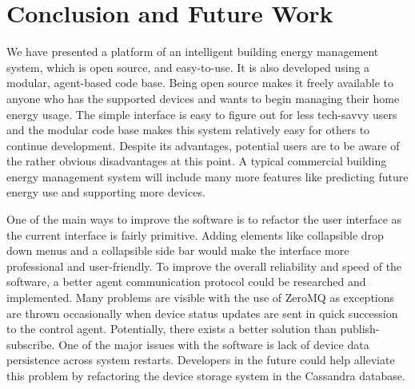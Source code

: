 \documentclass[conference]{IEEEtran}
\begin{document}
\section{Conclusion and Future Work}
\label{sec:conclusion}

We have presented a platform of an intelligent building energy management system,
which is open source, and easy-to-use. It is also developed using a modular, agent-based code base. Being open source makes it freely available to anyone who has the supported devices and wants to begin managing their home energy usage. The simple interface is easy to figure out for less tech-savvy users and the modular code base makes this system relatively easy for others to continue development. Despite its advantages, potential users are to be aware of the rather obvious disadvantages at this point. A typical commercial building energy management system will include many more features like predicting future energy use and supporting more devices.

One of the main ways to improve the software is to refactor the user interface as the current interface is fairly primitive. Adding elements like collapsible drop down menus and a collapsible side bar would make the interface more professional and user-friendly. To improve the overall reliability and speed of the software, a better agent communication protocol could be researched and implemented. Many problems are visible with the use of ZeroMQ as exceptions are thrown occasionally when device status updates are sent in quick succession to the control agent. Potentially, there exists a better solution than publish-subscribe. One of the major issues with the software is lack of device data persistence across system restarts. Developers in the future could help alleviate this problem by refactoring the device storage system in the Cassandra database.



\end{document}
